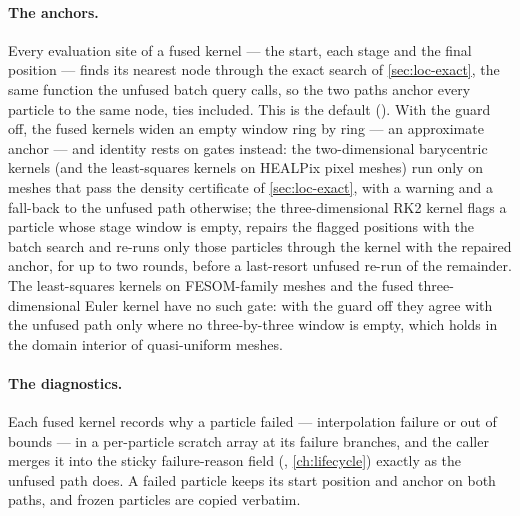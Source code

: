 \paragraph{The anchors.} Every evaluation site of a fused kernel --- the start, each stage and the
final position --- finds its nearest node through the exact search of \cref{sec:loc-exact}, the same
function the unfused batch query calls, so the two paths anchor every particle to the same node, ties
included. This is the default (). With the guard off, the fused
kernels widen an empty window ring by ring --- an approximate anchor --- and identity rests on gates
instead: the two-dimensional barycentric kernels (and the least-squares kernels on HEALPix pixel
meshes) run only on meshes that pass the density certificate of \cref{sec:loc-exact}, with a warning
and a fall-back to the unfused path otherwise; the three-dimensional RK2 kernel flags a particle whose
stage window is empty, repairs the flagged positions with the batch search and re-runs only those
particles through the kernel with the repaired anchor, for up to two rounds, before a last-resort
unfused re-run of the remainder. The least-squares kernels on FESOM-family meshes and the fused
three-dimensional Euler kernel have no such gate: with the guard off they agree with the unfused path
only where no three-by-three window is empty, which holds in the domain interior of quasi-uniform meshes.

\paragraph{The diagnostics.} Each fused kernel records why a particle failed --- interpolation failure
or out of bounds --- in a per-particle scratch array at its failure branches, and the caller merges it
into the sticky failure-reason field (, \cref{ch:lifecycle}) exactly
as the unfused path does. A failed particle keeps its start position and anchor on both paths, and
frozen particles are copied verbatim.

